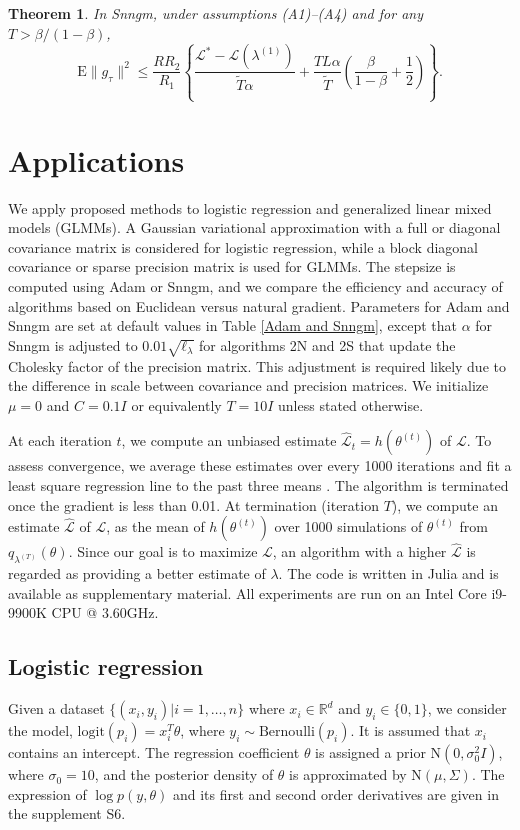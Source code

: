 \documentclass{statsoc}
\newtheorem{theorem}{Theorem}
\newcommand\E{{\text{E}}}
\newcommand\mL{{\mathcal{L}}}
\newcommand\N{{\text{N}}}
\newcommand\logit{\text{logit}}
\begin{document}
\begin{theorem} \label{thm NSNGAM}
In Snngm, under assumptions (A1)--(A4) and for any $T > \beta/(1-\beta)$, 
\begin{equation*} 
\E\|g_\tau \|^2 \leq \frac{R R_2}{ R_1} \left\{ \frac{\mL^* - \mL(\lambda^{(1)})}{\widetilde{T} \alpha} +  \frac{TL\alpha}{\widetilde{T}}  \left( \frac{\beta}{1-\beta} + \frac{1}{2} \right) \right\}.
\end{equation*}
\end{theorem}



\section{Applications} \label{sec_applications}
We apply proposed methods to logistic regression and generalized linear mixed models (GLMMs). A Gaussian variational approximation with a full or diagonal covariance matrix is considered for logistic regression, while a block diagonal covariance or sparse precision matrix is used for GLMMs. The stepsize is computed using Adam or Snngm, and we compare the efficiency and accuracy of algorithms based on Euclidean versus natural gradient. Parameters for Adam and Snngm are set at default values in Table \ref{Adam and Snngm}, except that $\alpha$ for Snngm is adjusted to $0.01\sqrt{\ell_\lambda}$ for algorithms 2N and 2S that update the Cholesky factor of the precision matrix. This adjustment is required likely due to the difference in scale between covariance and precision matrices. We initialize $\mu = 0$ and $C = 0.1 I$ or equivalently $T = 10 I$ unless stated otherwise.

At each iteration $t$, we compute an unbiased estimate $\widehat{\mL}_t = h(\theta^{(t)})$ of $\mL$. To assess convergence, we average these estimates over every 1000 iterations and fit a least square regression line to the past three means \citep{Tan2021}. The algorithm is terminated once the gradient is less than 0.01. At termination (iteration $T$), we compute an estimate $\hat{\mL}$ of $\mL$, as the mean of $h(\theta^{(t)})$ over 1000 simulations of $\theta^{(t)}$ from $q_{\lambda^{(T)}}(\theta)$. Since our goal is to maximize $\mL$, an algorithm with a higher $\hat{\mL}$ is regarded as providing a better estimate of $\lambda$. The code is written in Julia \citep{Bezanson2017} and is available as supplementary material. All experiments are run on an Intel Core i9-9900K CPU @ 3.60GHz.


\subsection{Logistic regression}
Given a dataset $\{(x_i, y_i)|i=1, \dots, n\}$ where $x_i \in \mathbb{R}^d$ and $y_i \in \{0,1\}$, we consider the model, $\logit(p_i) = x_i^T  \theta$, where $y_i \sim \text{Bernoulli}(p_i)$. It is assumed that $x_i$ contains an intercept. The regression coefficient $\theta$ is assigned a prior $\N(0, \sigma_0^2 I)$, where $\sigma_0 = 10$, and the posterior density of $\theta$ is approximated by $\N(\mu, \Sigma)$. The expression of $\log p(y, \theta)$ and its first and second order derivatives are given in the supplement S6.
\end{document}
